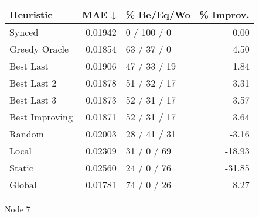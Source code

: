 \begin{tabular}{lrlr}
\toprule
\textbf{Heuristic} & \textbf{MAE ↓} & \textbf{\% Be/Eq/Wo} & \textbf{\% Improv.} \\
\midrule
            Synced &        0.01942 &          0 / 100 / 0 &                0.00 \\
     Greedy Oracle &        0.01854 &          63 / 37 / 0 &                4.50 \\
         Best Last &        0.01906 &         47 / 33 / 19 &                1.84 \\
       Best Last 2 &        0.01878 &         51 / 32 / 17 &                3.31 \\
       Best Last 3 &        0.01873 &         52 / 31 / 17 &                3.57 \\
    Best Improving &        0.01871 &         52 / 31 / 17 &                3.64 \\
            Random &        0.02003 &         28 / 41 / 31 &               -3.16 \\
             Local &        0.02309 &          31 / 0 / 69 &              -18.93 \\
            Static &        0.02560 &          24 / 0 / 76 &              -31.85 \\
            Global &        0.01781 &          74 / 0 / 26 &                8.27 \\
\bottomrule
\end{tabular}
\caption{Node 7}
\label{tab:iid_lr05_le2_bs2_7}
